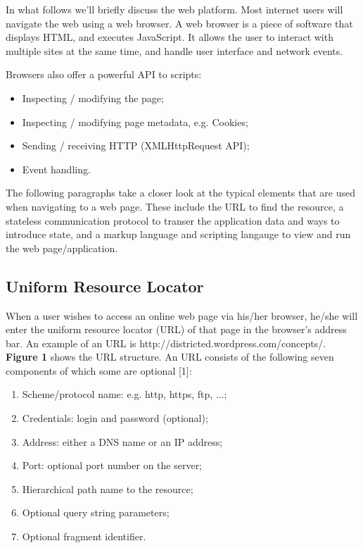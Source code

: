 In what follows we'll briefly discuss the web platform. Most internet users will navigate the web using a web browser. A web browser is a piece of software that displays HTML, and executes JavaScript. It allows the user to interact with multiple sites at the same time, and handle user interface and network events.

Browsers also offer a powerful API to scripts:
\begin{itemize}
	\item Inspecting / modifying the page;
	\item Inspecting / modifying page metadata, e.g. Cookies;
	\item Sending / receiving HTTP (XMLHttpRequest API);
	\item Event handling.
\end{itemize}

The following paragraphs take a closer look at the typical elements that are used when navigating to a web page. These include the URL to find the resource, a stateless communication protocol to transer the application data and ways to introduce state, and a markup language and scripting langauge to view and run the web page/application.


\subsection{Uniform Resource Locator}

When a user wishes to access an online web page via his/her browser, he/she will enter the uniform resource locator (URL) of that page in the browser's address bar. An example of an URL is http://districted.wordpress.com/concepts/. \textbf{Figure 1} shows the URL structure. An URL consists of the following seven components of which some are optional [1]:
\begin{enumerate}
	\item Scheme/protocol name: e.g. http, https, ftp, ...;
	\item Credentials: login and password (optional);
	\item Address: either a DNS name or an IP address;
	\item Port: optional port number on the server;
	\item Hierarchical path name to the resource;
	\item Optional query string parameters;
	\item Optional fragment identifier.
\end{enumerate}


